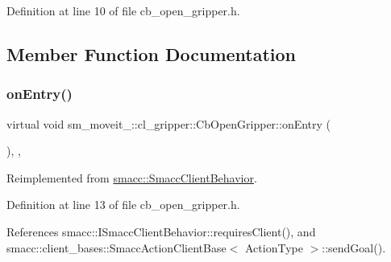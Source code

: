 Definition at line 10 of file cb\+\_\+open\+\_\+gripper.\+h.



\subsection{Member Function Documentation}
\mbox{\label{classsm__moveit__2_1_1cl__gripper_1_1CbOpenGripper_aaa18f60580c10e891b572f61f85ffb05}} 
\subsubsection{\texorpdfstring{on\+Entry()}{onEntry()}}
{\footnotesize\ttfamily virtual void sm\+\_\+moveit\+\_\+::cl\+\_\+gripper\+::\+Cb\+Open\+Gripper\+::on\+Entry (\begin{DoxyParamCaption}{ }\end{DoxyParamCaption})\hspace{0.3cm}{\ttfamily [inline]}, {\ttfamily [override]}, {\ttfamily [virtual]}}



Reimplemented from \hyperlink{classsmacc_1_1SmaccClientBehavior_ad5d3e1f1697c3cfe66c94cadba948493}{smacc\+::\+Smacc\+Client\+Behavior}.



Definition at line 13 of file cb\+\_\+open\+\_\+gripper.\+h.



References smacc\+::\+I\+Smacc\+Client\+Behavior\+::requires\+Client(), and smacc\+::client\+\_\+bases\+::\+Smacc\+Action\+Client\+Base$<$ Action\+Type $>$\+::send\+Goal().


